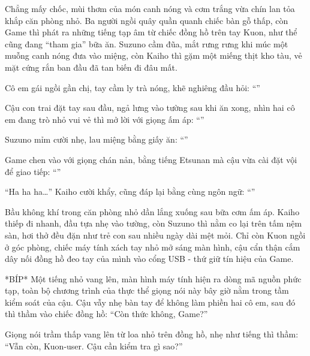 \documentclass[../main.tex]{subfiles}
\begin{document}
Chẳng mấy chốc, mùi thơm của món canh nóng và cơm trắng vừa chín lan tỏa khắp căn phòng nhỏ. Ba người ngồi quây quần quanh chiếc bàn gỗ thấp, còn Game thì phát ra những tiếng tạp âm từ chiếc đồng hồ trên tay Kuon, như thể cũng đang ``tham gia'' bữa ăn. Suzuno cầm đũa, mắt rưng rưng khi múc một muỗng canh nóng đưa vào miệng, còn Kaiho thì gặm một miếng thịt kho tàu, vẻ mặt cứng rắn ban đầu đã tan biến đi đâu mất.

Cô em gái ngồi gần chị, tay cầm ly trà nóng, khẽ nghiêng đầu hỏi: ``''

Cậu con trai đặt tay sau đầu, ngả lưng vào tường sau khi ăn xong, nhìn hai cô em đang trò nhỏ vui vẻ thì mở lời với giọng ấm áp: ``''

Suzuno mỉm cười nhẹ, lau miệng bằng giấy ăn: ``''

Game chen vào với giọng chán nản, bằng tiếng Etsunan mà cậu vừa cài đặt vội để giao tiếp: ``''

``Ha ha ha\dots'' Kaiho cười khẩy, cũng đáp lại bằng cùng ngôn ngữ: ``''

\ct


Bầu không khí trong căn phòng nhỏ dần lắng xuống sau bữa cơm ấm áp. Kaiho thiếp đi nhanh, đầu tựa nhẹ vào tường, còn Suzuno thì nằm co lại trên tấm nệm sàn, hơi thở đều đặn như trẻ con sau nhiều ngày dài mệt mỏi. Chỉ còn Kuon ngồi ở góc phòng, chiếc máy tính xách tay nhỏ mở sáng màn hình, cậu cẩn thận cắm dây nối đồng hồ đeo tay của mình vào cổng USB - thứ giữ tín hiệu của Game.

*BÍP* Một tiếng nhỏ vang lên, màn hình máy tính hiện ra dòng mã nguồn phức tạp, toàn bộ chương trình của thực thể giọng nói này bây giờ nằm trong tầm kiểm soát của cậu. Cậu vẫy nhẹ bàn tay để không làm phiền hai cô em, sau đó thì thầm vào chiếc đồng hồ: ``Còn thức không, Game?''

Giọng nói trầm thấp vang lên từ loa nhỏ trên đồng hồ, nhẹ như tiếng thì thầm: ``Vẫn còn, Kuon-user. Cậu cần kiểm tra gì sao?''
\end{document}

